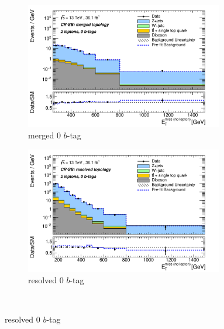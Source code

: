 \begin{figure}[htbp]
\centering
  \begin{subfigure}{0.45\textwidth}
    \centering
    \includegraphics[width=0.95\textwidth]{figures/monoV/postfit/monoV_2lep_0tag_merged_massFail_met_XS.pdf}
    \caption{merged 0 \(b\)-tag}
  \end{subfigure}
    \begin{subfigure}{0.45\textwidth}
    \centering
    \includegraphics[width=0.95\textwidth]{figures/monoV/postfit/monoV_2lep_0tag_resolved_massFail_met_XS.pdf}
    \caption{resolved 0 \(b\)-tag}
  \end{subfigure} \\


\end{figure}
